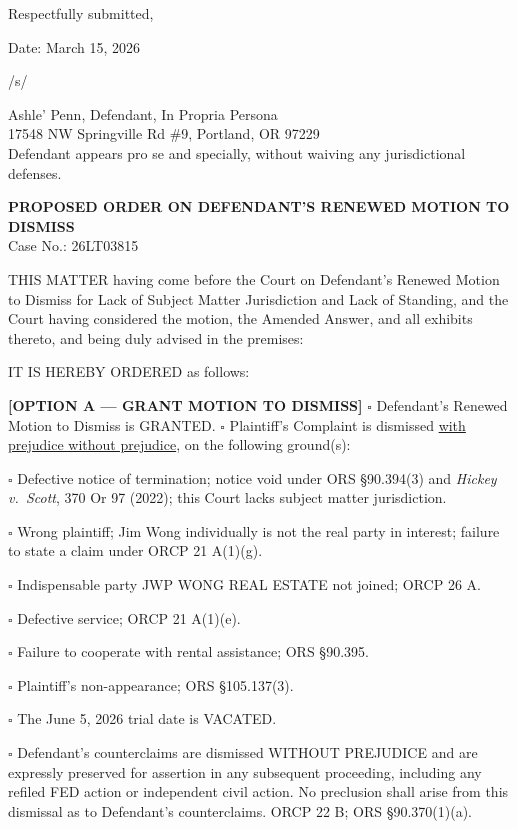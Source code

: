\documentclass[12pt,letterpaper]{article}
\begin{document}
Respectfully submitted,

Date: March 15, 2026

/s/

Ashle' Penn, Defendant, In Propria Persona \\
17548 NW Springville Rd \#9, Portland, OR 97229 \\
Defendant appears pro se and specially, without waiving any jurisdictional defenses.

\newpage
\begin{center}
\textbf{PROPOSED ORDER ON DEFENDANT'S RENEWED MOTION TO DISMISS} \\
Case No.: 26LT03815
\end{center}

THIS MATTER having come before the Court on Defendant's Renewed Motion to Dismiss for Lack of Subject Matter Jurisdiction and Lack of Standing, and the Court having considered the motion, the Amended Answer, and all exhibits thereto, and being duly advised in the premises:

IT IS HEREBY ORDERED as follows:

\textbf{[OPTION A --- GRANT MOTION TO DISMISS]} $\square$ Defendant's Renewed Motion to Dismiss is GRANTED. $\square$ Plaintiff's Complaint is dismissed \underline{\hspace{1.5in} with prejudice \hspace{1.5in} without prejudice}, on the following ground(s):

$\square$ Defective notice of termination; notice void under ORS \S90.394(3) and \textit{Hickey v.\ Scott}, 370 Or 97 (2022); this Court lacks subject matter jurisdiction.

$\square$ Wrong plaintiff; Jim Wong individually is not the real party in interest; failure to state a claim under ORCP 21 A(1)(g).

$\square$ Indispensable party JWP WONG REAL ESTATE not joined; ORCP 26 A.

$\square$ Defective service; ORCP 21 A(1)(e).

$\square$ Failure to cooperate with rental assistance; ORS \S90.395.

$\square$ Plaintiff's non-appearance; ORS \S105.137(3).

$\square$ The June 5, 2026 trial date is VACATED.

$\square$ Defendant's counterclaims are dismissed WITHOUT PREJUDICE and are expressly preserved for assertion in any subsequent proceeding, including any refiled FED action or independent civil action. No preclusion shall arise from this dismissal as to Defendant's counterclaims. ORCP 22 B; ORS \S90.370(1)(a).
\end{document}
